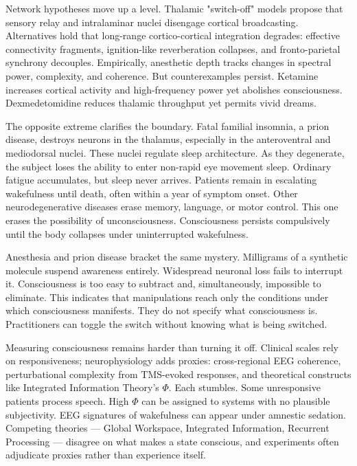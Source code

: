 Network hypotheses move up a level. Thalamic "switch-off" models propose that sensory relay and intralaminar nuclei disengage cortical broadcasting. Alternatives hold that long-range cortico-cortical integration degrades: effective connectivity fragments, ignition-like reverberation collapses, and fronto-parietal synchrony decouples. Empirically, anesthetic depth tracks changes in spectral power, complexity, and coherence. But counterexamples persist. Ketamine increases cortical activity and high-frequency power yet abolishes consciousness. Dexmedetomidine reduces thalamic throughput yet permits vivid dreams.

The opposite extreme clarifies the boundary. Fatal familial insomnia, a prion disease, destroys neurons in the thalamus, especially in the anteroventral and mediodorsal nuclei. These nuclei regulate sleep architecture. As they degenerate, the subject loses the ability to enter non-rapid eye movement sleep. Ordinary fatigue accumulates, but sleep never arrives. Patients remain in escalating wakefulness until death, often within a year of symptom onset. Other neurodegenerative diseases erase memory, language, or motor control. This one erases the possibility of unconsciousness. Consciousness persists compulsively until the body collapses under uninterrupted wakefulness.

Anesthesia and prion disease bracket the same mystery. Milligrams of a synthetic molecule suspend awareness entirely. Widespread neuronal loss fails to interrupt it. Consciousness is too easy to subtract and, simultaneously, impossible to eliminate. This indicates that manipulations reach only the conditions under which consciousness manifests. They do not specify what consciousness is. Practitioners can toggle the switch without knowing what is being switched.

Measuring consciousness remains harder than turning it off. Clinical scales rely on responsiveness; neurophysiology adds proxies: cross-regional EEG coherence, perturbational complexity from TMS-evoked responses, and theoretical constructs like Integrated Information Theory's $\Phi$. Each stumbles. Some unresponsive patients process speech. High $\Phi$ can be assigned to systems with no plausible subjectivity. EEG signatures of wakefulness can appear under amnestic sedation. Competing theories — Global Workspace, Integrated Information, Recurrent Processing — disagree on what makes a state conscious, and experiments often adjudicate proxies rather than experience itself.

